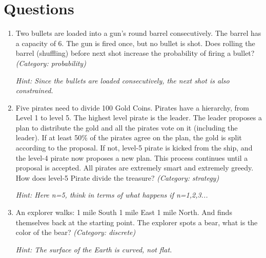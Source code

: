 \section{Questions}
\begin{enumerate}

\item Two bullets are loaded into a gun's round barrel consecutively. The barrel has a capacity of 6. The gun is fired once, but no bullet is shot. Does rolling the barrel (shuffling) before next shot increase the probability of firing a bullet?
\small\emph{(Category: probability)}

\small\emph{Hint: Since the bullets are loaded consecutively, the next shot is also constrained.}





\item Five pirates need to divide 100 Gold Coins. Pirates have a hierarchy, from Level 1 to level 5. The highest level pirate is the leader. The leader proposes a plan to distribute the gold and all the pirates vote on it (including the leader). If at least 50\% of the pirates agree on the plan, the gold is split according to the proposal. If not, level-5 pirate is kicked from the ship, and the level-4 pirate now proposes a new plan. This process continues until a proposal is accepted. All pirates are extremely smart and extremely greedy. How does level-5 Pirate divide the treasure?
\small\emph{(Category: strategy)}

\small\emph{Hint: Here n=5, think in terms of what happens if n=1,2,3...}





\item An explorer walks:
1 mile South
1 mile East
1 mile North.
And finds themselves back at the starting point. The explorer spots a bear, what is the color of the bear?
\small\emph{(Category: discrete)}

\small\emph{Hint: The surface of the Earth is curved, not flat.}


\end{enumerate}

